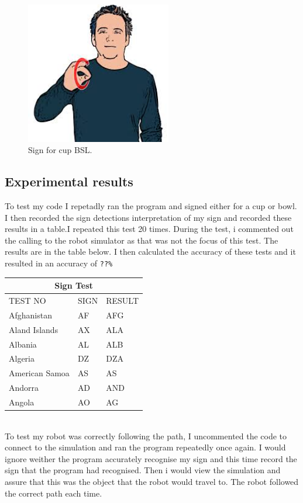 \documentclass[lettersize,journal]{IEEEtran}
\begin{document}
\begin{figure}[h]
\centering
\includegraphics[width=2.5in]{pic3}
\caption{Sign for cup BSL.}
\label{fig_3}
\end{figure}


\subsection{Experimental results }

To test my code I repetadly ran the program and signed either for a cup or bowl. I then recorded the sign detections interpretation of my sign and recorded these results in a table.I repeated this test 20 times. During the test, i commented out the calling to the robot simulator as that was not the focus of this test. The results are in the table below. I then calculated the accuracy of these tests and it resulted in an accuracy of  \texttt{??\%}
\hfill \break

\begin{tabular}{ |p{2cm}|p{2cm}|p{2cm}|}
 \hline
 \multicolumn{3}{|c|}{Sign Test} \\
 \hline
 TEST NO&SIGN &RESULT\\
 \hline
 Afghanistan   & AF    &AFG\\
 Aland Islands&   AX  & ALA  \\
 Albania &AL & ALB\\
 Algeria    &DZ & DZA\\
 American Samoa&   AS  & AS\\
 Andorra& AD  & AND   \\
 Angola& AO  & AG\\
 \hline
\end{tabular}
\\
To test my robot was correctly following the path, I uncommented the code to connect to the simulation and ran the program repeatedly once again.  I would ignore weither the program accurately recognise my sign and this time record the sign that the program had recognised.  Then i would view the simulation and assure that this was the object that the robot would travel to. The robot followed the correct path each time.
\hfill \break
\end{document}
